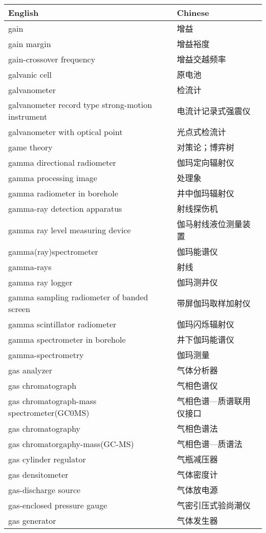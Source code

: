 \documentclass[
]{article}
\begin{document}
\begin{longtable}[]{@{}ll@{}}
\toprule()
English & Chinese \\
\midrule()
\endhead
gain & 增益 \\
gain margin & 增益裕度 \\
gain-crossover frequency & 增益交越频率 \\
galvanic cell & 原电池 \\
galvanometer & 检流计 \\
galvanometer record type strong-motion instrument &
电流计记录式强震仪 \\
galvanometer with optical point & 光点式检流计 \\
game theory & 对策论；博弈树 \\
gamma directional radiometer & 伽玛定向辐射仪 \\
gamma processing image & 处理象 \\
gamma radiometer in borehole & 井中伽玛辐射仪 \\
gamma-ray detection apparatus & 射线探伤机 \\
gamma ray level measuring device & 伽马射线液位测量装置 \\
gamma(ray)spectrometer & 伽玛能谱仪 \\
gamma-rays & 射线 \\
gamma ray logger & 伽玛测井仪 \\
gamma sampling radiometer of banded screen & 带屏伽玛取样加射仪 \\
gamma scintillator radiometer & 伽玛闪烁辐射仪 \\
gamma spectrometer in borehole & 井下伽玛能谱仪 \\
gamma-spectrometry & 伽玛测量 \\
gas analyzer & 气体分析器 \\
gas chromatograph & 气相色谱仪 \\
gas chromatograph-mass spectrometer(GC0MS) &
气相色谱---质谱联用仪接口 \\
gas chromatography & 气相色谱法 \\
gas chromatorgaphy-mass(GC-MS) & 气相色谱---质谱法 \\
gas cylinder regulator & 气瓶减压器 \\
gas densitometer & 气体密度计 \\
gas-discharge source & 气体放电源 \\
gas-enclosed pressure gauge & 气密引压式验尚潮仪 \\
gas generator & 气体发生器 \\

\end{longtable}
\end{document}
